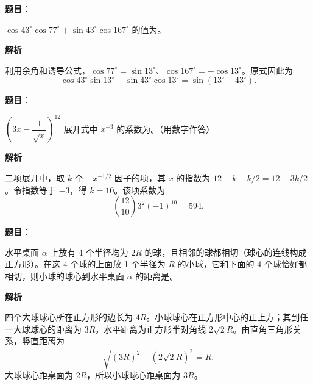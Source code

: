 \begin{answer}

\textbf{题目}：

\(\cos43^\circ\cos77^\circ+\sin43^\circ\cos167^\circ\) 的值为\gkblank{}。

\textbf{解析}

利用余角和诱导公式，\(\cos77^\circ=\sin13^\circ\)、\(\cos167^\circ=-\cos13^\circ\)。原式因此为
\nopagebreak[4]
\[
\cos43^\circ\sin13^\circ-\sin43^\circ\cos13^\circ
=\sin(13^\circ-43^\circ).
\]


\end{answer}
\begin{answer}

\textbf{题目}：

\(\left(3x-\dfrac1{\sqrt{x}}\right)^{12}\) 展开式中 \(x^{-3}\) 的系数为\gkblank{}。（用数字作答）

\textbf{解析}

二项展开中，取 \(k\) 个 \(-x^{-1/2}\) 因子的项，其 \(x\) 的指数为 \(12-k-k/2=12-3k/2\)。令指数等于 \(-3\)，得 \(k=10\)。该项系数为
\nopagebreak[4]
\[
\binom{12}{10}3^{2}(-1)^{10}=594.
\]


\end{answer}
\begin{answer}

\textbf{题目}：

水平桌面 \(\alpha\) 上放有 4 个半径均为 \(2R\) 的球，且相邻的球都相切（球心的连线构成正方形）。在这 4 个球的上面放 1 个半径为 \(R\) 的小球，它和下面的 4 个球恰好都相切，则小球的球心到水平桌面 \(\alpha\) 的距离是\gkblank{}。

\textbf{解析}

四个大球球心所在正方形的边长为 \(4R\)。小球球心在正方形中心的正上方；其到任一大球球心的距离为 \(3R\)，水平距离为正方形半对角线 \(2\sqrt2R\)。由直角三角形关系，竖直距离为
\nopagebreak[4]
\[
\sqrt{(3R)^2-(2\sqrt2R)^2}=R.
\]
大球球心距桌面为 \(2R\)，所以小球球心距桌面为 \(3R\)。


\end{answer}

